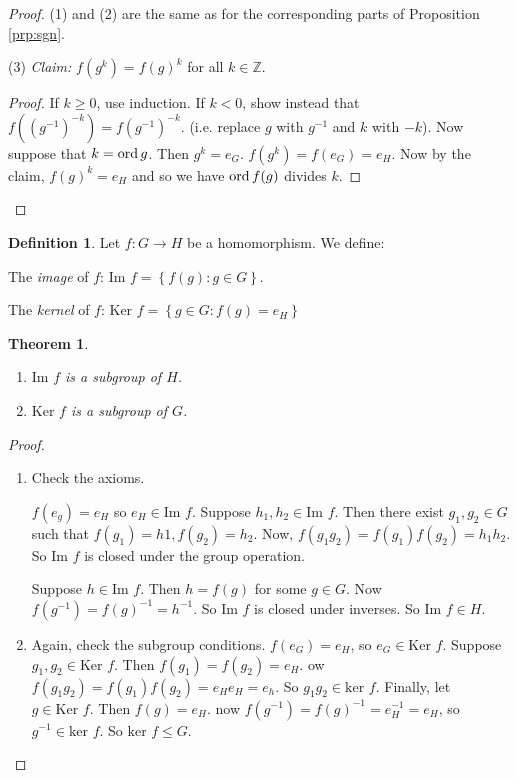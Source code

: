 \documentclass{article}
\newtheorem{theorem}{Theorem}
\theoremstyle{definition} \newtheorem*{definition}{Definition}
\begin{document}
\begin{proof} (1) and (2) are the same as for the corresponding parts of
  Proposition \ref{prp:sgn}.

  (3) \emph{Claim:} $f(g^k)=f(g)^k$ for all $k\in \mathbb{Z}.$ \begin{proof} If
    $k \geq 0$, use induction. If $k<0$, show instead that $f\left( \left(
    g^{-1} \right)^{-k} \right)=f(g^{-1})^{-k}$. (i.e. replace $g$ with
    $g^{-1}$ and $k$ with $-k$). Now suppose that $k=\operatorname{\text{ord}} g$. Then $g^k = e_G$.
    $f(g^k)=f(e_G)=e_H$. Now by the claim, $f(g)^k=e_H$ and so we have $\operatorname{\text{ord}}
    f(g)$ divides $k$.  \end{proof} \end{proof}

\begin{definition} Let $f:G \rightarrow H$ be a homomorphism. We define: 
  
  The \emph{image} of $f$: $\text{Im } f = \left\{ f(g) : g \in G \right\}$.

  The \emph{kernel} of $f$: $\text{Ker } f=\left\{ g \in G : f(g) = e_H
  \right\}$\\ \end{definition}

\begin{theorem}\hfill \begin{enumerate} \item $\text{Im } f$ is a subgroup of
        $H$.  \item $\text{Ker } f$ is a subgroup of $G$.  \end{enumerate}
      \label{} \end{theorem}

\begin{proof}\hfill \begin{enumerate} \item Check the axioms.

      $f(e_g)=e_H$ so $e_H \in \text{Im }f$.  Suppose $h_1, h_2 \in \text{Im }
      f$. Then there exist $g_1, g_2 \in G$ such that $f(g_1)=h1, f(g_2)=h_2$.
      Now, $f(g_1 g_2)=f(g_1)f(g_2)=h_1 h_2$. So $\text{Im }f$ is closed under
      the group operation.

      Suppose $h \in \text{Im }f. $ Then $h=f(g)$ for some $g \in G$. Now
      $f(g^{-1})=f(g)^{-1}=h^{-1}$. So $\text{Im }f$ is closed under inverses.
      So $\text{Im } f \in H $.

    \item Again, check the subgroup conditions.  $f(e_G)=e_H$, so $e_G \in
      \text{Ker }f$. Suppose $g_1, g_2 \in \text{Ker }f$. Then
      $f(g_1)=f(g_2)=e_H$. ow $f(g_1 g_2)=f(g_1)f(g_2)=e_He_H=e_h$. So $g_1 g_2
      \in \text{ker }f$. Finally, let $g \in \text{Ker }f$. Then $f(g)=e_H$.
      now $f(g^{-1})=f(g)^{-1}=e_H^{-1}=e_H$, so $g^{-1} \in \text{ker }f$. So
      $\text{ker }f \leq G$.  \end{enumerate} \end{proof}
\end{document}
